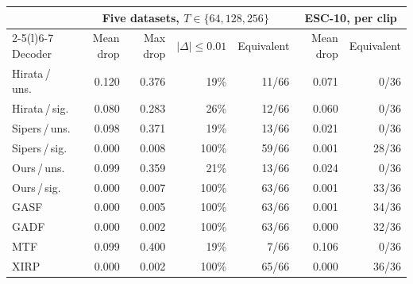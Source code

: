 \begin{tabular}{@{}lrrrrrr@{}}
\toprule
& \multicolumn{4}{c}{Five datasets, $T\in\{64,128,256\}$} & \multicolumn{2}{c}{ESC-10, per clip} \\
\cmidrule(lr){2-5}\cmidrule(l){6-7}
Decoder & Mean drop & Max drop & $|\Delta|\le0.01$ & Equivalent & Mean drop & Equivalent \\
\midrule
Hirata\,/\,uns. & 0.120 & 0.376 & 19\% & 11/66 & 0.071 & 0/36 \\
Hirata\,/\,sig. & 0.080 & 0.283 & 26\% & 12/66 & 0.060 & 0/36 \\
Sipers\,/\,uns. & 0.098 & 0.371 & 19\% & 13/66 & 0.021 & 0/36 \\
Sipers\,/\,sig. & 0.000 & 0.008 & 100\% & 59/66 & 0.001 & 28/36 \\
Ours\,/\,uns. & 0.099 & 0.359 & 21\% & 13/66 & 0.024 & 0/36 \\
Ours\,/\,sig. & 0.000 & 0.007 & 100\% & 63/66 & 0.001 & 33/36 \\
GASF & 0.000 & 0.005 & 100\% & 63/66 & 0.001 & 34/36 \\
GADF & 0.000 & 0.002 & 100\% & 63/66 & 0.000 & 32/36 \\
MTF & 0.099 & 0.400 & 19\% & 7/66 & 0.106 & 0/36 \\
XIRP & 0.000 & 0.002 & 100\% & 65/66 & 0.000 & 36/36 \\
\bottomrule
\end{tabular}
